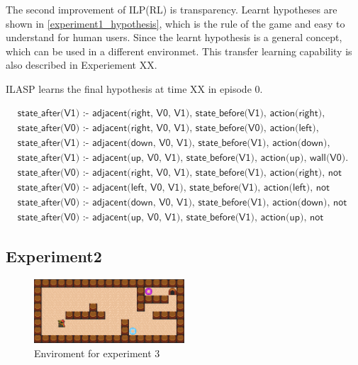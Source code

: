 The second improvement of ILP(RL) is transparency. 
Learnt hypotheses are shown in \ref{experiment1_hypothesis}, 
which is the rule of the game and easy to understand for human users. Since the learnt hypothesis is a general concept, which can be used in a different environmet. 
This transfer learning capability is also described in Experiement XX. 

ILASP learns the final hypothesis at time XX in episode 0.

\begin{equation}
\begin{split}
&\textsf{state\_after(V1) :- adjacent(right, V0, V1), state\_before(V1), action(right), wall(V0).}\\
&\textsf{state\_after(V0) :- adjacent(right, V0, V1), state\_before(V0), action(left), wall(V1).}\\
&\textsf{state\_after(V1) :- adjacent(down, V0, V1), state\_before(V1), action(down), wall(V0).}\\
&\textsf{state\_after(V1) :- adjacent(up, V0, V1), state\_before(V1), action(up), wall(V0).}\\
&\textsf{state\_after(V0) :- adjacent(right, V0, V1), state\_before(V1), action(right), not wall(V0).}\\
&\textsf{state\_after(V0) :- adjacent(left, V0, V1), state\_before(V1), action(left), not wall(V0).}\\
&\textsf{state\_after(V0) :- adjacent(down, V0, V1), state\_before(V1), action(down), not wall(V0).}\\
&\textsf{state\_after(V0) :- adjacent(up, V0, V1), state\_before(V1), action(up), not wall(V0).}
\end{split}
\end{equation}
\label{experiment1_hypothesis}

\newpage
\subsection{Experiment2}

\begin{figure}[!htb]
\centering
\includegraphics[width=0.5\textwidth]{./figures/experiment3}
\caption{Enviroment for experiment 3}
\label{experiment3}
\end{figure}

